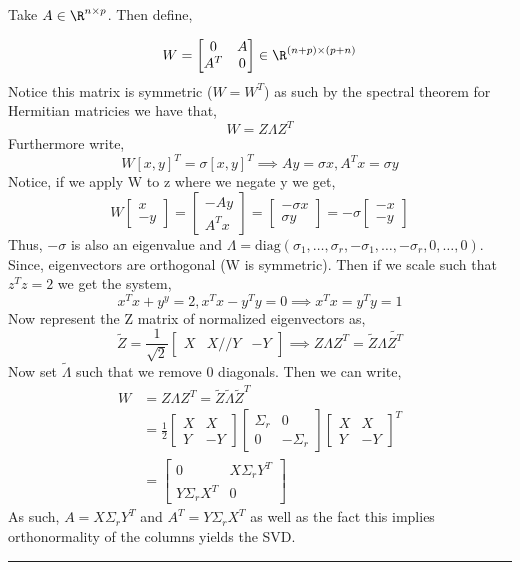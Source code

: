 \documentclass[twoside]{article}
\newenvironment{proof}{{\bf Proof:}}{\hfill\rule{2mm}{2mm}}
\begin{document}
\begin{proof}
Take $A \in \R^{n \times p}$. Then define,

$$W = \begin{bmatrix}0 & A \\ A^T & 0\end{bmatrix} \in \R^{(n+p)\times(p+n)}$$
Notice this matrix is symmetric ($W=W^T$) as such by the spectral theorem for Hermitian matricies we have that,
$$W = Z\Lambda Z^T$$
Furthermore write,
$$W[x,y]^T = \sigma [x,y]^T \implies Ay = \sigma x, A^Tx = \sigma y$$
Notice, if we apply W to z where we negate y we get,
$$W\begin{bmatrix}x \\ -y\end{bmatrix} = \begin{bmatrix}-Ay \\ A^Tx \end{bmatrix} =  \begin{bmatrix}-\sigma x \\ \sigma y \end{bmatrix} = -\sigma  \begin{bmatrix}-x \\ -y \end{bmatrix}$$
Thus, $-\sigma$ is also an eigenvalue and $\Lambda = \text{diag}(\sigma_1,\dots,\sigma_r,-\sigma_1,\dots,-\sigma_r,0,\dots,0)$. Since, eigenvectors are orthogonal (W is symmetric). Then if we scale such that $z^Tz=2$ we get the system,
$$x^Tx + y^y = 2, x^Tx - y^Ty = 0 \implies x^Tx = y^Ty = 1$$
Now represent the Z matrix of normalized eigenvectors as,
$$\tilde{Z} = \frac{1}{\sqrt{2}}\begin{bmatrix}X&X//Y&-Y\end{bmatrix} \implies Z\Lambda Z^T = \tilde{Z}\Lambda\tilde{Z^T}$$
Now set $\tilde{\Lambda}$ such that we remove 0 diagonals. Then we can write,
$$\begin{aligned}W &= Z\Lambda Z^T = \tilde{Z}\tilde{\Lambda}\tilde{Z}^T 
\\&=\frac{1}{2}\begin{bmatrix}X&X\\Y&-Y\end{bmatrix}\begin{bmatrix}\Sigma_r&0\\0&-\Sigma_r\end{bmatrix}\begin{bmatrix}X&X\\Y&-Y\end{bmatrix}^T
\\& = \begin{bmatrix}0&X\Sigma_rY^T\\Y\Sigma_rX^T&0\end{bmatrix}
\end{aligned}$$
As such, $A = X\Sigma_rY^T$ and $A^T = Y\Sigma_rX^T$ as well as the fact this implies orthonormality of the columns yields the SVD. 
\end{proof}
\end{document}
